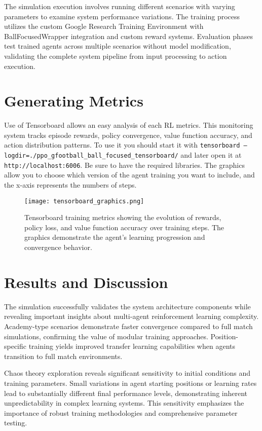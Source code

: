 \documentclass[12pt,a4paper]{article}
\begin{document}
The simulation execution involves running different scenarios with varying parameters to examine system performance variations. The training process utilizes the custom Google Research Training Environment with BallFocusedWrapper integration and custom reward systems. Evaluation phases test trained agents across multiple scenarios without model modification, validating the complete system pipeline from input processing to action execution.

\section{Generating Metrics}

Use of Tensorboard allows an easy analysis of each RL metrics. This monitoring system tracks episode rewards, policy convergence, value function accuracy, and action distribution patterns. To use it you should start it with \texttt{tensorboard --logdir=./ppo\_gfootball\_ball\_focused\_tensorboard/} and later open it at \texttt{http://localhost:6006}. Be sure to have the required libraries. The graphics allow you to choose which version of the agent training you want to include, and the x-axis represents the numbers of steps.

\begin{figure}[H]
    \centering
    \texttt{[image: tensorboard\_graphics.png]}
    \caption{Tensorboard training metrics showing the evolution of rewards, policy loss, and value function accuracy over training steps. The graphics demonstrate the agent's learning progression and convergence behavior.}
    \label{fig:tensorboard}
\end{figure}    
\section{Results and Discussion}

The simulation successfully validates the system architecture components while revealing important insights about multi-agent reinforcement learning complexity. Academy-type scenarios demonstrate faster convergence compared to full match simulations, confirming the value of modular training approaches. Position-specific training yields improved transfer learning capabilities when agents transition to full match environments.

Chaos theory exploration reveals significant sensitivity to initial conditions and training parameters. Small variations in agent starting positions or learning rates lead to substantially different final performance levels, demonstrating inherent unpredictability in complex learning systems. This sensitivity emphasizes the importance of robust training methodologies and comprehensive parameter testing.
\end{document}
